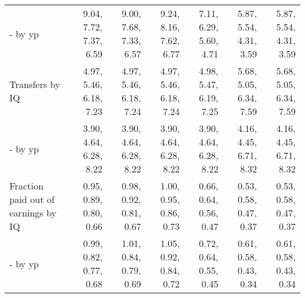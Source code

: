 \begin{tabular}{lrrrrrr}
- by yp & 9.04, 7.72, 7.37, 6.59  & 9.00, 7.68, 7.33, 6.57  & 9.24, 8.16, 7.62, 6.77  & 7.11, 6.29, 5.60, 4.71  & 5.87, 5.54, 4.31, 3.59  & 5.87, 5.54, 4.31, 3.59  \\ 
Transfers by IQ & 4.97, 5.46, 6.18, 7.23  & 4.97, 5.46, 6.18, 7.24  & 4.97, 5.46, 6.18, 7.24  & 4.98, 5.47, 6.19, 7.25  & 5.68, 5.05, 6.34, 7.59  & 5.68, 5.05, 6.34, 7.59  \\ 
- by yp & 3.90, 4.64, 6.28, 8.22  & 3.90, 4.64, 6.28, 8.22  & 3.90, 4.64, 6.28, 8.22  & 3.90, 4.64, 6.28, 8.22  & 4.16, 4.45, 6.71, 8.32  & 4.16, 4.45, 6.71, 8.32  \\ 
Fraction paid out of earnings by IQ & 0.95, 0.89, 0.80, 0.66  & 0.98, 0.92, 0.81, 0.67  & 1.00, 0.95, 0.86, 0.73  & 0.66, 0.64, 0.56, 0.47  & 0.53, 0.58, 0.47, 0.37  & 0.53, 0.58, 0.47, 0.37  \\ 
- by yp & 0.99, 0.82, 0.77, 0.68  & 1.01, 0.84, 0.79, 0.69  & 1.05, 0.92, 0.84, 0.72  & 0.72, 0.64, 0.55, 0.45  & 0.61, 0.58, 0.43, 0.34  & 0.61, 0.58, 0.43, 0.34  \\ 
\hline
\end{tabular}%
